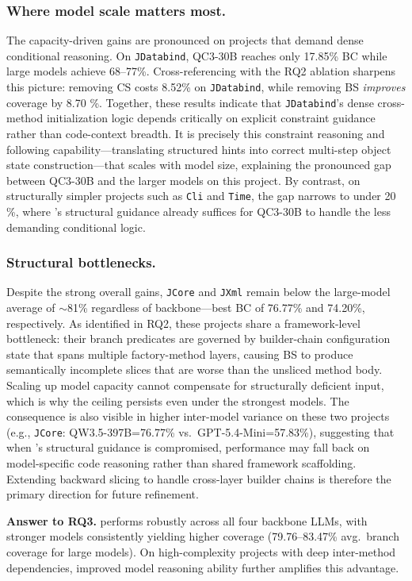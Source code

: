 \subsubsection{Where model scale matters most.}
The capacity-driven gains are pronounced on projects that demand dense conditional reasoning. 
On \texttt{JDatabind}, QC3-30B reaches only 17.85\% BC while large models achieve 68--77\%. 
Cross-referencing with the RQ2 ablation sharpens this picture: removing CS costs 8.52\% on \texttt{JDatabind}, while removing BS \emph{improves} coverage by 8.70 \%.
Together, these results indicate that \texttt{JDatabind}'s dense cross-method initialization logic depends critically on explicit constraint guidance rather than code-context breadth. 
It is precisely this constraint reasoning and following capability---translating structured hints into correct multi-step object state construction---that scales with model size, explaining the pronounced gap between QC3-30B and the larger models on this project.
By contrast, on structurally simpler projects such as \texttt{Cli} and \texttt{Time}, the gap narrows to under 20 \%, where \ourmethod{}'s structural guidance already suffices for QC3-30B to handle the less demanding conditional logic.

\subsubsection{Structural bottlenecks.} 
Despite the strong overall gains, \texttt{JCore} and \texttt{JXml} remain below the large-model average of $\sim$81\% regardless of backbone---best BC of 76.77\% and 74.20\%, respectively. 
As identified in RQ2, these projects share a framework-level bottleneck: their branch predicates are governed by builder-chain configuration state that spans multiple factory-method layers, causing BS to produce semantically incomplete slices that are worse than the unsliced method body. 
Scaling up model capacity cannot compensate for structurally deficient input, which is why the ceiling persists even under the strongest models. 
The consequence is also visible in higher inter-model variance on these two projects (e.g., \texttt{JCore}: QW3.5-397B=76.77\% vs.\ GPT-5.4-Mini=57.83\%), suggesting that when \ourmethod{}'s structural guidance is compromised, performance may fall back on model-specific code reasoning rather than shared framework scaffolding. 
Extending backward slicing to handle cross-layer builder chains is therefore the primary direction for future refinement.

\noindent\textbf{Answer to RQ3.}
\ourmethod{} performs robustly across all four backbone LLMs, with stronger models consistently yielding higher coverage (79.76--83.47\% avg.\ branch coverage for large models).
On high-complexity projects with deep inter-method dependencies, improved model reasoning ability further amplifies this advantage.
